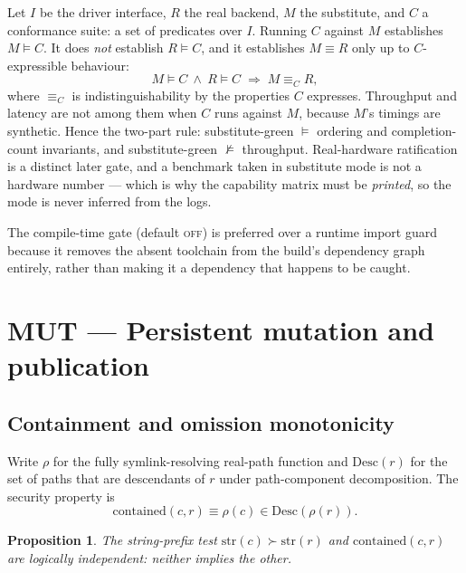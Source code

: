 \documentclass[11pt]{article}
\newtheorem{prop}{Proposition}[section]
\begin{document}
Let $I$ be the driver interface, $R$ the real backend, $M$ the substitute, and
$C$ a conformance suite: a set of predicates over $I$. Running $C$ against $M$
establishes $M \models C$. It does \emph{not} establish $R \models C$, and it
establishes $M \equiv R$ only up to $C$-expressible behaviour:
\begin{equation}
M \models C \ \wedge\ R \models C \;\Longrightarrow\; M \equiv_C R,
\end{equation}
where $\equiv_C$ is indistinguishability by the properties $C$ expresses.
Throughput and latency are not among them when $C$ runs against $M$, because
$M$'s timings are synthetic. Hence the two-part rule: substitute-green
$\models$ ordering and completion-count invariants, and substitute-green
$\nvDash$ throughput. Real-hardware ratification is a distinct later gate, and
a benchmark taken in substitute mode is not a hardware number --- which is why
the capability matrix must be \emph{printed}, so the mode is never inferred
from the logs.

The compile-time gate (default \textsc{off}) is preferred over a runtime import
guard because it removes the absent toolchain from the build's dependency
graph entirely, rather than making it a dependency that happens to be caught.

\section{MUT --- Persistent mutation and publication}

\subsection{Containment and omission monotonicity}
\label{lbl:HS-MUT-01}

Write $\rho$ for the fully symlink-resolving real-path function and
$\mathrm{Desc}(r)$ for the set of paths that are descendants of $r$ under
path-component decomposition. The security property is
\begin{equation}
\mathrm{contained}(c, r) \equiv \rho(c) \in \mathrm{Desc}(\rho(r)).
\end{equation}

\begin{prop}
The string-prefix test $\mathrm{str}(c) \succ \mathrm{str}(r)$ and
$\mathrm{contained}(c,r)$ are logically independent: neither implies the other.
\end{prop}
\end{document}
